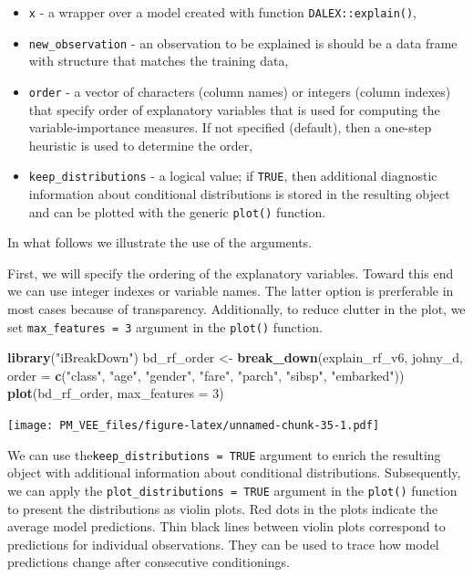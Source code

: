 \documentclass[12pt,]{krantz}
\newenvironment{Shaded}{\begin{snugshade}}{\end{snugshade}}
\newcommand{\DataTypeTok}[1]{\textcolor[rgb]{0.13,0.29,0.53}{#1}}
\newcommand{\DecValTok}[1]{\textcolor[rgb]{0.00,0.00,0.81}{#1}}
\newcommand{\KeywordTok}[1]{\textcolor[rgb]{0.13,0.29,0.53}{\textbf{#1}}}
\newcommand{\NormalTok}[1]{#1}
\newcommand{\StringTok}[1]{\textcolor[rgb]{0.31,0.60,0.02}{#1}}
\providecommand{\tightlist}{%
  \setlength{\itemsep}{0pt}\setlength{\parskip}{0pt}}
\begin{document}
\begin{itemize}
\tightlist
\item
  \texttt{x} - a wrapper over a model created with function \texttt{DALEX::explain()},
\item
  \texttt{new\_observation} - an observation to be explained is should be a data frame with structure that matches the training data,
\item
  \texttt{order} - a vector of characters (column names) or integers (column indexes) that specify order of explanatory variables that is used for computing the variable-importance measures. If not specified (default), then a one-step heuristic is used to determine the order,
\item
  \texttt{keep\_distributions} - a logical value; if \texttt{TRUE}, then additional diagnostic information about conditional distributions is stored in the resulting object and can be plotted with the generic \texttt{plot()} function.
\end{itemize}

In what follows we illustrate the use of the arguments.

First, we will specify the ordering of the explanatory variables. Toward this end we can use integer indexes or variable names. The latter option is prerferable in most cases because of transparency. Additionally, to reduce clutter in the plot, we set \texttt{max\_features\ =\ 3} argument in the \texttt{plot()} function.

\begin{Shaded}
\begin{Highlighting}[]
\KeywordTok{library}\NormalTok{(}\StringTok{"iBreakDown"}\NormalTok{)}
\NormalTok{bd_rf_order <-}\StringTok{ }\KeywordTok{break_down}\NormalTok{(explain_rf_v6,}
\NormalTok{                 johny_d,}
                 \DataTypeTok{order =} \KeywordTok{c}\NormalTok{(}\StringTok{"class"}\NormalTok{, }\StringTok{"age"}\NormalTok{, }\StringTok{"gender"}\NormalTok{, }\StringTok{"fare"}\NormalTok{, }\StringTok{"parch"}\NormalTok{, }\StringTok{"sibsp"}\NormalTok{, }\StringTok{"embarked"}\NormalTok{))}
\KeywordTok{plot}\NormalTok{(bd_rf_order, }\DataTypeTok{max_features =} \DecValTok{3}\NormalTok{) }
\end{Highlighting}
\end{Shaded}

\texttt{[image: PM\_VEE\_files/figure-latex/unnamed-chunk-35-1.pdf]}

We can use the\texttt{keep\_distributions\ =\ TRUE} argument to enrich the resulting object with additional information about conditional distributions. Subsequently, we can apply the \texttt{plot\_distributions\ =\ TRUE} argument in the \texttt{plot()} function to present the distributions as violin plots. Red dots in the plots indicate the average model predictions. Thin black lines between violin plots correspond to predictions for individual observations. They can be used to trace how model predictions change after consecutive conditionings.
\end{document}

